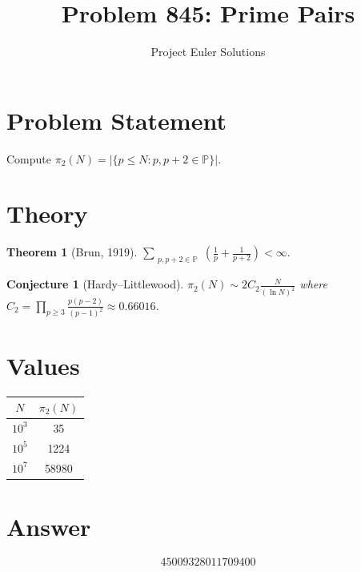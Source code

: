 \documentclass[11pt]{article}
\title{Problem 845: Prime Pairs}
\author{Project Euler Solutions}
\date{}
\newtheorem{theorem}{Theorem}
\newtheorem{conjecture}{Conjecture}
\begin{document}
\maketitle

\section{Problem Statement}
Compute $\pi_2(N) = |\{p \le N : p, p+2 \in \mathbb{P}\}|$.

\section{Theory}

\begin{theorem}[Brun, 1919]
$\displaystyle\sum_{\substack{p,p+2\in\mathbb{P}}} \left(\frac{1}{p}+\frac{1}{p+2}\right) < \infty.$
\end{theorem}

\begin{conjecture}[Hardy--Littlewood]
$\pi_2(N) \sim 2C_2 \frac{N}{(\ln N)^2}$ where $C_2 = \prod_{p\ge3}\frac{p(p-2)}{(p-1)^2} \approx 0.66016$.
\end{conjecture}

\section{Values}
\begin{center}
\begin{tabular}{cc}
\toprule $N$ & $\pi_2(N)$ \\ \midrule
$10^3$ & 35 \\ $10^5$ & 1224 \\ $10^7$ & 58980 \\ \bottomrule
\end{tabular}
\end{center}

\section{Answer}

\[
\boxed{45009328011709400}
\]
\end{document}
